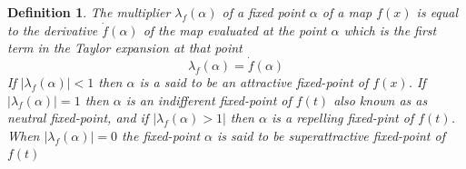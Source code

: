 \documentclass{elsarticle}
\newtheorem{definition}{Definition}
\begin{document}
\begin{definition}
  The multiplier $\lambda_f (\alpha)$ of a fixed point $\alpha$ of a map $f
  (x)$ is equal to the derivative $\dot{f} (\alpha)$ of the map evaluated at
  the point $\alpha$ which is the first term in the Taylor expansion at that
  point
  \begin{equation}
    \lambda_f (\alpha) = \dot{f} (\alpha)
  \end{equation}
  If $| \lambda_f (\alpha) | < 1$ then $\alpha$ is a said to be an attractive
  fixed-point of $f (x)$. If $| \lambda_f (\alpha) | = 1$ then $\alpha$ is an
  indifferent fixed-point of $f (t)$ also known as as neutral fixed-point, and
  if $| \lambda_f (\alpha) > 1 |$ then $\alpha$ is a repelling fixed-pint of
  $f (t)$. When $| \lambda_f (\alpha) | = 0$ the fixed-point $\alpha$ is said
  to be superattractive fixed-point of $f
  (t)${\cite[3.]{raadstrom1953iteration}}
\end{definition}
\end{document}

